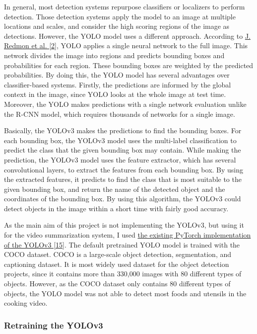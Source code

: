 \documentclass{article}
\begin{document}
In general, most detection systems repurpose classifiers or localizers to perform detection. Those detection systems apply the model to an image at multiple locations and scales, and consider the high scoring regions of the image as detections. However, the YOLO model uses a different approach. According to \hyperlink{ref2}{J. Redmon et al. [2]}, YOLO applies a single neural network to the full image. This network divides the image into regions and predicts bounding boxes and probabilities for each region. These bounding boxes are weighted by the predicted probabilities. By doing this, the YOLO model has several advantages over classifier-based systems. Firstly, the predictions are informed by the global context in the image, since YOLO looks at the whole image at test time. Moreover, the YOLO makes predictions with a single network evaluation unlike the R-CNN model, which requires thousands of networks for a single image.

Basically, the YOLOv3 makes the predictions to find the bounding boxes. For each bounding box, the YOLOv3 model uses the multi-label classification to predict the class that the given bounding box may contain. While making the prediction, the YOLOv3 model uses the feature extractor, which has several convolutional layers, to extract the features from each bounding box. By using the extracted features, it predicts to find the class that is most suitable to the given bounding box, and return the name of the detected object and the coordinates of the bounding box. By using this algorithm, the YOLOv3 could detect objects in the image within a short time with fairly good accuracy.

As the main aim of this project is not implementing the YOLOv3, but using it for the video summarization system, I used \hyperlink{ref15}{the existing PyTorch implementation of the YOLOv3 [15]}. The default pretrained YOLO model is trained with the COCO dataset. COCO is a large-scale object detection, segmentation, and captioning dataset. It is most widely used dataset for the object detection projects, since it contains more than 330,000 images with 80 different types of objects. However, as the COCO dataset only contains 80 different types of objects, the YOLO model was not able to detect most foods and utensils in the cooking video.

\subsubsection{Retraining the YOLOv3}
\end{document}
